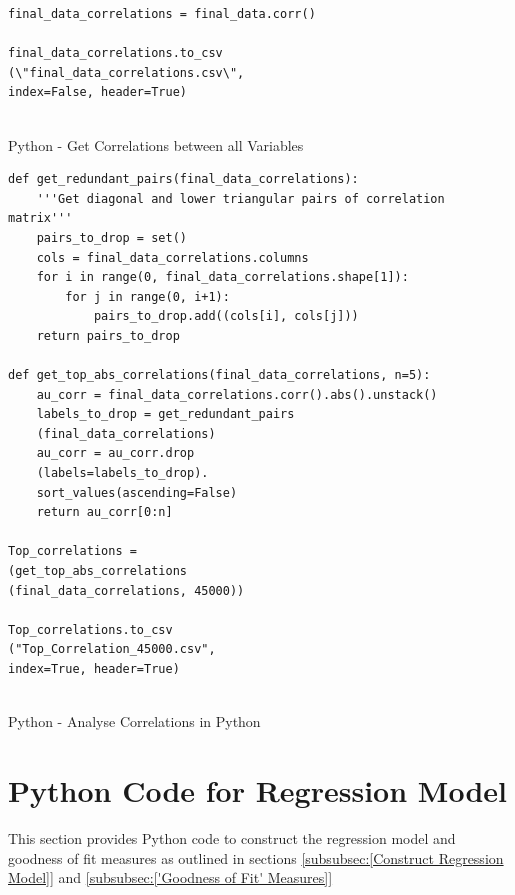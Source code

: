 \documentclass[12pt]{scrartcl}
\begin{document}
\begin{listing}[H]
\begin{verbatim}
final_data_correlations = final_data.corr()

final_data_correlations.to_csv
(\"final_data_correlations.csv\", 
index=False, header=True)


\end{verbatim}
\caption{Python - Get Correlations between all Variables}
\label{list:[Python - Get Correlations between all Variables]}
\end{listing}

\begin{listing}[H]
\begin{verbatim}
def get_redundant_pairs(final_data_correlations):
    '''Get diagonal and lower triangular pairs of correlation matrix'''
    pairs_to_drop = set()
    cols = final_data_correlations.columns
    for i in range(0, final_data_correlations.shape[1]):
        for j in range(0, i+1):
            pairs_to_drop.add((cols[i], cols[j]))
    return pairs_to_drop
    
def get_top_abs_correlations(final_data_correlations, n=5):
    au_corr = final_data_correlations.corr().abs().unstack()
    labels_to_drop = get_redundant_pairs
    (final_data_correlations)
    au_corr = au_corr.drop
    (labels=labels_to_drop).
    sort_values(ascending=False)
    return au_corr[0:n]
    
Top_correlations = 
(get_top_abs_correlations
(final_data_correlations, 45000))

Top_correlations.to_csv
("Top_Correlation_45000.csv", 
index=True, header=True)


\end{verbatim}
\caption{Python - Analyse Correlations in Python}
\label{list:[Python - Analyse Correlations in Python]}
\end{listing}


\section{Python Code for Regression Model}
\label{sec:[Python Code for Regression Model]}
This section provides Python code to construct the regression model and goodness of fit measures as outlined in sections \ref{subsubsec:[Construct Regression Model]} and \ref{subsubsec:['Goodness of Fit' Measures]}
\end{document}
